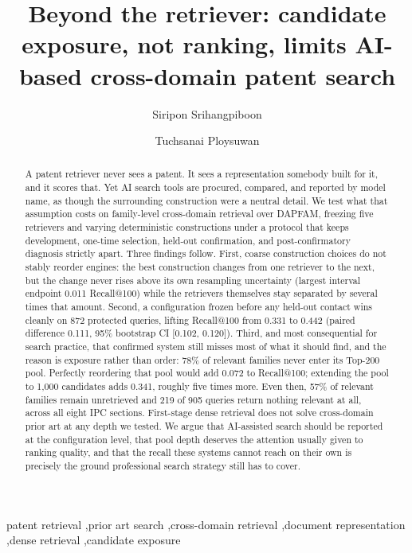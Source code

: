 \documentclass[preprint,11pt,authoryear]{elsarticle}          %
\begin{document}
\begin{frontmatter}

\title{Beyond the retriever: candidate exposure, not ranking, limits AI-based cross-domain patent search}

\author[a]{Siripon Srihangpiboon}
\author[a]{Tuchsanai Ploysuwan}
\address[a]{School of Information Technology, King Mongkut's Institute of Technology Ladkrabang, Bangkok, Thailand}

\begin{abstract}
A patent retriever never sees a patent. It sees a representation somebody built for it, and it scores that. Yet AI search tools are procured, compared, and reported by model name, as though the surrounding construction were a neutral detail. We test what that assumption costs on family-level cross-domain retrieval over DAPFAM, freezing five retrievers and varying deterministic constructions under a protocol that keeps development, one-time selection, held-out confirmation, and post-confirmatory diagnosis strictly apart. Three findings follow. First, coarse construction choices do not stably reorder engines: the best construction changes from one retriever to the next, but the change never rises above its own resampling uncertainty (largest interval endpoint 0.011 Recall@100) while the retrievers themselves stay separated by several times that amount. Second, a configuration frozen before any held-out contact wins cleanly on 872 protected queries, lifting Recall@100 from 0.331 to 0.442 (paired difference 0.111, 95\% bootstrap CI [0.102, 0.120]). Third, and most consequential for search practice, that confirmed system still misses most of what it should find, and the reason is exposure rather than order: 78\% of relevant families never enter its Top-200 pool. Perfectly reordering that pool would add 0.072 to Recall@100; extending the pool to 1{,}000 candidates adds 0.341, roughly five times more. Even then, 57\% of relevant families remain unretrieved and 219 of 905 queries return nothing relevant at all, across all eight IPC sections. First-stage dense retrieval does not solve cross-domain prior art at any depth we tested. We argue that AI-assisted search should be reported at the configuration level, that pool depth deserves the attention usually given to ranking quality, and that the recall these systems cannot reach on their own is precisely the ground professional search strategy still has to cover.
\end{abstract}

\begin{keyword}
patent retrieval \sep prior art search \sep cross-domain retrieval \sep document representation \sep dense retrieval \sep candidate exposure
\end{keyword}

\end{frontmatter}
\end{document}
